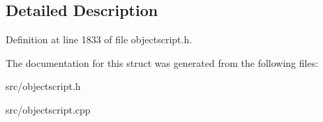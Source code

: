 \subsection{Detailed Description}


Definition at line 1833 of file objectscript.\+h.



The documentation for this struct was generated from the following files\+:\begin{DoxyCompactItemize}
\item 
src/objectscript.\+h\item 
src/objectscript.\+cpp\end{DoxyCompactItemize}

